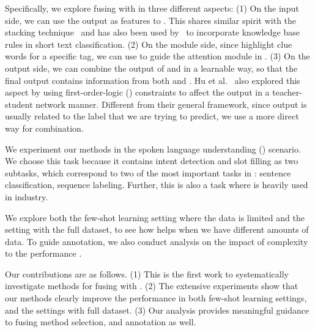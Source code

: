 


Specifically, we explore fusing \RE with \NN in three different aspects: (1) On the \NN input side, we can use the \RE output as features
to \NN. This shares similar spirit with the stacking technique~\cite{wolpert1992stacked} and has also been used by~\cite{wang2017combining}
to incorporate knowledge base rules in short text classification.
(2) On the \NN module side, since \REs highlight clue words for a
specific tag, we can use \RE to guide the attention module in \NN. (3) On the \NN output side, we can combine the output of \RE and \NN in
a learnable way, so that the final output contains information from both \NN and \RE. Hu et al.~ also explored
this aspect by using first-order-logic (\FOL) constraints to affect the \NN output in a teacher-student network manner. Different from
their general framework, since \RE output is usually related to the label that we are trying to predict, we use a more direct way for
combination.

We experiment our methods in the spoken language understanding (\SLU) scenario. We choose this task because it contains intent detection
and slot filling as two subtasks, which correspond to two of the most important tasks in \NLP: sentence classification, sequence labeling.
Further, this is also a task where \RE is heavily used in industry.

We explore both the few-shot learning setting where the data is limited and the setting with the full dataset, to see how \RE helps when we have different amounts of data.
To guide \RE annotation, we also conduct analysis on the impact of \RE complexity to the performance \NN.

Our contributions are as follows. (1) This is the first work to systematically investigate methods for fusing \RE with \NN. (2) The
extensive experiments show that our methods clearly improve the \NN performance in both few-shot learning settings, and the settings with
full dataset. (3) Our analysis provides meaningful guidance to fusing method selection, and \RE annotation as well.
